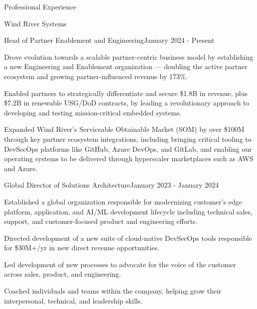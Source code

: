\documentclass{resume} %
\begin{document}



\begin{rSection}{Professional Experience}
  
  \begin{rCompany}{Wind River Systems}{}{}

    \begin{rSubSubsection}{Head of Partner Enablement and Engineering}{}{January 2024 - Present}
      \item Drove evolution towards a scalable partner-centric business model by establishing a new Engineering and Enablement organization --- doubling the active partner ecosystem and growing partner-influenced revenue by 173\%.
      \item Enabled partners to strategically differentiate and secure \$1.8B in revenue, plus \$7.2B in renewable USG/DoD contracts, by leading a revolutionary approach to developing and testing mission-critical embedded systems.
      \item Expanded Wind River's Serviceable Obtainable Market (SOM) by over \$100M through key partner ecosystem integrations, including bringing critical tooling to DevSecOps platforms like GitHub, Azure DevOps, and GitLab, and enabling our operating systems to be delivered through hyperscaler marketplaces such as AWS and Azure.

    \end{rSubSubsection}
    
    \begin{rSubSubsection}{Global Director of Solutions Architecture}{}{January 2023 - January 2024}
      \item Established a global organization responsible for modernizing customer's edge platform, application, and AI/ML development lifecycle including technical sales, support, and customer-focused product and engineering efforts.
      \item Directed development of a new suite of cloud-native DevSecOps tools responsible for \$30M+/yr in new direct revenue opportunities.
      \item Led development of new processes to advocate for the voice of the customer across sales, product, and engineering.
      \item Coached individuals and teams within the company, helping grow their interpersonal, technical, and leadership skills.
    \end{rSubSubsection}
  \end{rCompany}


\end{rSection}
\end{document}
